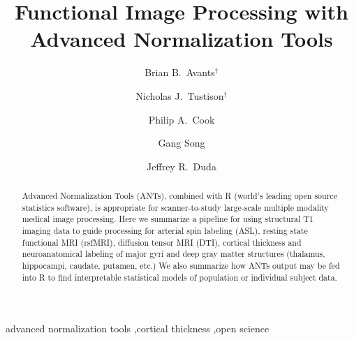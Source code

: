 \documentclass[preprint,1p,times]{elsarticle}
\begin{document}
\begin{frontmatter}

\title{Functional Image Processing with Advanced Normalization Tools}

\author[label1]{Brian B.~Avants$^\dagger$}
\author[label2]{Nicholas J.~Tustison$^\dagger$
  }
\author[label1]{Philip A.~Cook}
\author[label1]{Gang Song}
\author[label1]{Jeffrey R.~Duda}
\address[label1]{Penn Image Computing and Science Laboratory, University of Pennsylvania, Philadelphia, PA}
\address[label2]{Department of Radiology and Medical Imaging, University of Virginia, Charlottesville, VA}

\begin{abstract} 
Advanced Normalization Tools (ANTs), combined with R (world's leading
open source statistics software), is appropriate for scanner-to-study
large-scale multiple modality medical image processing.  Here we
summarize a pipeline for using structural T1 imaging data to guide
processing for arterial spin labeling (ASL), resting state functional
MRI (rsfMRI), diffusion tensor MRI (DTI), cortical thickness and
neuroanatomical labeling of major gyri and deep gray matter structures
(thalamus, hippocampi, caudate, putamen, etc.)  We also summarize how
ANTs output may be fed into R to find interpretable statistical models
of population or individual subject data.
\end{abstract}

\begin{keyword}
advanced normalization tools \sep cortical thickness \sep open science
\end{keyword}

\end{frontmatter}
%
%
\newpage
\end{document}
